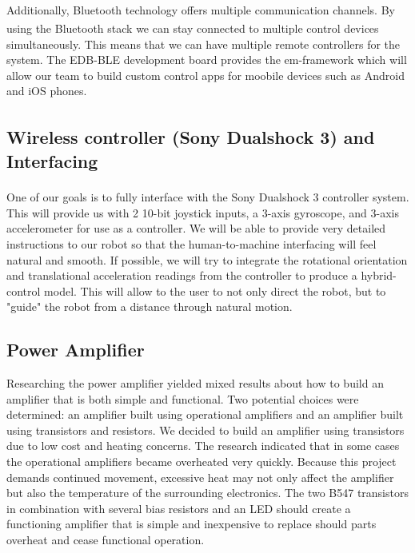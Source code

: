 \documentclass[11pt]{report}
\begin{document}
\begin{spacing}{1.5}
Additionally, Bluetooth\textsuperscript{\textregistered} technology offers multiple communication channels.  By using the Bluetooth\textsuperscript{\textregistered} stack we can stay connected to multiple control devices simultaneously.  This means that we can have multiple remote controllers for the system.  The EDB-BLE development board provides the em-framework which will allow our team to build custom control apps for moobile devices such as Android and iOS phones.

\subsection*{Wireless controller (Sony Dualshock 3\textsuperscript{\textregistered}) and Interfacing}

One of our goals is to fully interface with the Sony Dualshock 3\textsuperscript{\textregistered} controller system.  This will provide us with 2 10-bit joystick inputs, a 3-axis gyroscope, and 3-axis accelerometer for use as a controller.  We will be able to provide very detailed instructions to our robot so that the human-to-machine interfacing will feel natural and smooth.  If possible, we will try to integrate the rotational orientation and translational acceleration readings from the controller to produce a hybrid-control model.  This will allow to the user to not only direct the robot, but to "guide" the robot from a distance through natural motion.

\subsection*{Power Amplifier}

Researching the power amplifier yielded mixed results about how to build an amplifier that is both simple and functional. Two potential choices were determined: an amplifier built using operational amplifiers and an amplifier built using transistors and resistors. We decided to build an amplifier using transistors due to low cost and heating concerns.  The research indicated that in some cases the operational amplifiers became overheated very quickly. Because this project demands continued movement, excessive heat may not only affect the amplifier but also the temperature of the surrounding electronics. The two B547 transistors in combination with several bias resistors and an LED should create a functioning amplifier that is simple and inexpensive to replace should parts overheat and cease functional operation.


\end{spacing}
\end{document}
